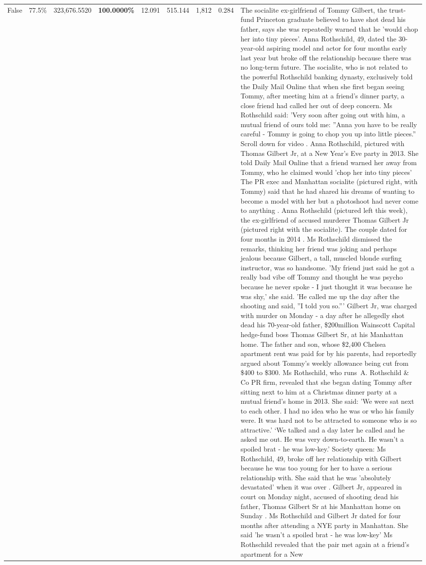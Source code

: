 \begin{table}[H]
\begin{tabular}{lllrlllll}
False & 77.5\% & 323,676.5520 & \bfseries \color{red} 100.0000\% & 12.091 & 515.144 & 1,812 & 0.284 & The socialite ex-girlfriend of Tommy Gilbert, the trust-fund Princeton graduate believed to have shot dead his father, says she was repeatedly warned that he 'would chop her into tiny pieces'. Anna Rothschild, 49, dated the 30-year-old aspiring model and actor for four months early last year but broke off the relationship because there was no long-term future. The socialite, who is not related to the powerful Rothschild banking dynasty, exclusively told the Daily Mail Online that when she first began seeing Tommy, after meeting him at a friend's dinner party, a close friend had called her out of deep concern. Ms Rothschild said: 'Very soon after going out with him, a mutual friend of ours told me: ''Anna you have to be really careful - Tommy is going to chop you up into little pieces.'' Scroll down for video . Anna Rothschild, pictured with Thomas Gilbert Jr, at a New Year's Eve party in 2013. She told Daily Mail Online that a friend warned her away from Tommy, who he claimed would 'chop her into tiny pieces' The PR exec and Manhattan socialite (pictured right, with Tommy) said that he had shared his dreams of wanting to become a model with her but a photoshoot had never come to anything . Anna Rothschild (pictured left this week), the ex-girlfriend of accused murderer Thomas Gilbert Jr (pictured right with the socialite). The couple dated for four months in 2014 . Ms Rothschild dismissed the remarks, thinking her friend was joking and perhaps jealous because Gilbert, a tall, muscled blonde surfing instructor, was so handsome. 'My friend just said he got a really bad vibe off Tommy and thought he was psycho because he never spoke - I just thought it was because he was shy,' she said. 'He called me up the day after the shooting and said, ''I told you so.''' Gilbert Jr, was charged with murder on Monday - a day after he allegedly shot dead his 70-year-old father, \$200million Wainscott Capital hedge-fund boss Thomas Gilbert Sr, at his Manhattan home. The father and son, whose \$2,400 Chelsea apartment rent was paid for by his parents, had reportedly argued about Tommy's weekly allowance being cut from \$400 to \$300. Ms Rothschild, who runs A. Rothschild \& Co PR firm, revealed that she began dating Tommy after sitting next to him at a Christmas dinner party at a mutual friend's home in 2013. She said: 'We were sat next to each other. I had no idea who he was or who his family were. It was hard not to be attracted to someone who is so attractive.' ‘We talked and a day later he called and he asked me out. He was very down-to-earth. He wasn’t a spoiled brat - he was low-key.’ Society queen: Ms Rothschild, 49, broke off her relationship with Gilbert because he was too young for her to have a serious relationship with. She said that he was 'absolutely devastated' when it was over . Gilbert Jr, appeared in court on Monday night, accused of shooting dead his father, Thomas Gilbert Sr at his Manhattan home on Sunday . Ms Rothschild and Gilbert Jr dated for four months after attending a NYE party in Manhattan. She said 'he wasn't a spoiled brat - he was low-key' Ms Rothschild revealed that the pair met again at a friend’s apartment for a New 
\end{tabular}
\end{table}
